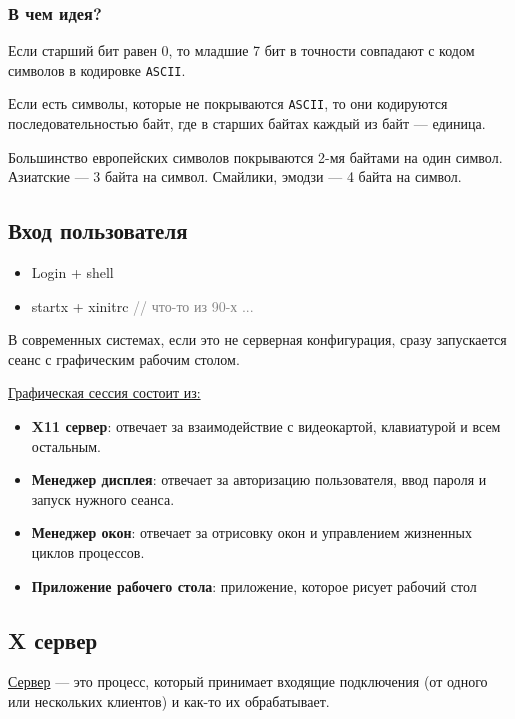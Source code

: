 \subsubsection{В чем идея?}

Если старший бит равен 0, то младшие 7 бит в точности совпадают с кодом символов в кодировке \texttt{ASCII}.

Если есть символы, которые не покрываются \texttt{ASCII}, то они кодируются последовательностью байт, где в старших байтах каждый из байт --- единица. 

Большинство европейских символов покрываются 2-мя байтами на один символ. Азиатские --- 3 байта на символ. Смайлики, эмодзи --- 4 байта на символ. 

\subsection{Вход пользователя}

\begin{itemize}
	\item Login + shell
	\item startx + xinitrc \textcolor{gray}{// что-то из 90-х ...}
\end{itemize}

В современных системах, если это не серверная конфигурация, сразу запускается сеанс с графическим рабочим столом.

\underline{Графическая сессия состоит из:}
\begin{itemize}
	\item \textbf{X11 сервер}: отвечает за взаимодействие с видеокартой, клавиатурой и всем остальным.
	\item \textbf{Менеджер дисплея}: отвечает за авторизацию пользователя, ввод пароля и запуск нужного сеанса.
	\item \textbf{Менеджер окон}: отвечает за отрисовку окон и управлением жизненных циклов процессов.
	\item \textbf{Приложение рабочего стола}: приложение, которое рисует рабочий стол
\end{itemize}

\subsection{X сервер}

\begin{Def}
	\underline{Сервер} --- это процесс, который принимает входящие подключения (от одного или нескольких клиентов) и как-то их обрабатывает.
\end{Def}

